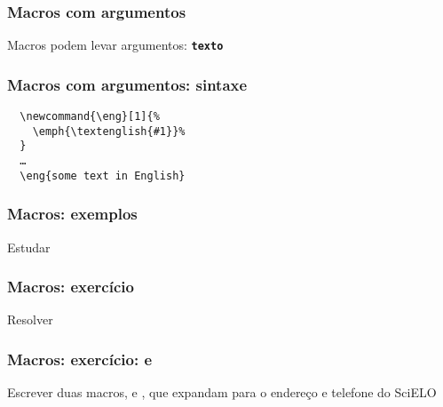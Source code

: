 {}

\begin{frame}
  \frametitle{Macros com argumentos}
  \LARGE
  Macros podem levar argumentos: \texttt{\textbf{texto}}
\end{frame}

\begin{frame}[fragile]
  \frametitle{Macros com argumentos: sintaxe}
  \begin{verbatim}
  \newcommand{\eng}[1]{%
    \emph{\textenglish{#1}}%
  }
  …
  \eng{some text in English}
  \end{verbatim}
\end{frame}

\begin{frame}
  \frametitle{Macros: exemplos}
  \huge
  Estudar 
\end{frame}

\begin{frame}
  \frametitle{Macros: exercício}
  \huge
  Resolver 
\end{frame}

\begin{frame}
  \frametitle{Macros: exercício: \latexcode{\address} e \latexcode{\telephone}}
  \LARGE
  Escrever duas macros, \latexcode{\address} e \latexcode{\telephone}, que
  expandam para o endereço e telefone do SciELO
\end{frame}


